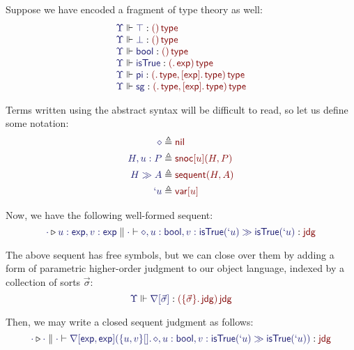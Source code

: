 \documentclass[11pt]{article}
\theoremstyle{definition}
\theoremstyle{remark}
\numberwithin{equation}{section}
\def\IModeColorName{MidnightBlue}
\def\OModeColorName{Maroon}
\newcommand\IMode[1]{{\color{\IModeColorName}{#1}}}
\newcommand\OMode[1]{{\color{\OModeColorName}{#1}}}
\newcommand\MkValence[3]{%
  \ifthenelse{\equal{#1}{}}{}{%
    \{#1\}%
  }%
  \ifthenelse{\equal{#2}{}}{}{%
    [#2]%
  }.\, #3%
}
\newcommand\MkBTm[3]{\{#1\}[#2].\, #3}
\newcommand\MkArity[2]{(#1)\, #2}
\newcommand\IsOperator[3]{\IMode{#1}\Vdash\IMode{#2}: \OMode{#3}}
\newcommand\IsAbt[5]{%
  \IMode{#1}\triangleright%
  \IMode{#2}\parallel%
  \IMode{#3}\vdash%
  \IMode{#4}:\OMode{#5}%
}
\newcommand\App[2]{#1(#2)}
\newcommand\SortExp{\mathsf{exp}}
\begin{document}
\newcommand\OpPi{\mathsf{pi}}
\newcommand\OpSg{\mathsf{sg}}
\newcommand\OpBool{\mathsf{bool}}
\newcommand\OpSo{\mathsf{isTrue}}

Suppose we have encoded a fragment of type theory as well:
\[
  \begin{array}{l}
    \IsOperator{\Upsilon}{\top}{
      \MkArity{}{\SortType}
    }\\
    \IsOperator{\Upsilon}{\bot}{
      \MkArity{}{\SortType}
    }\\
    \IsOperator{\Upsilon}{\OpBool}{
      \MkArity{}{\SortType}
    }\\
    \IsOperator{\Upsilon}{\OpSo}{
      \MkArity{
        \MkValence{}{}{\SortExp}
      }{\SortType}
    }\\
    \IsOperator{\Upsilon}{\OpPi}{
      \MkArity{
        \MkValence{}{}{\SortType},
        \MkValence{}{\SortExp}{\SortType}
      }{\SortType}
    }\\
    \IsOperator{\Upsilon}{\OpSg}{
      \MkArity{
        \MkValence{}{}{\SortType},
        \MkValence{}{\SortExp}{\SortType}
      }{\SortType}
    }\\
  \end{array}
\]

Terms written using the abstract syntax will be difficult to read, so let us
define some notation:
\begin{align*}
  \IMode{\diamond} &\triangleq \OMode{\OpNil}\\
  \IMode{H, u:P} &\triangleq \OMode{
    \App{\OpSnoc{u}}{H, P}
  }\\
  \IMode{H\gg A} &\triangleq \OMode{
    \App{\OpSequent}{
      H, A
    }
  }\\
  \IMode{`u} &\triangleq \OMode{\OpVar{u}}
\end{align*}

Now, we have the following well-formed sequent:
\[
  \IsAbt{\cdot}{
    u:\SortExp,
    v:\SortExp
  }{\cdot}{
    \diamond,u:\OpBool,v:\App{\OpSo}{`u}%
    \gg%
    \App{\OpSo}{`u}
  }{\SortJdg}
\]

\newcommand\OpNabla[1]{\nabla[#1]}

The above sequent has free symbols, but we can close over them by adding a form
of parametric higher-order judgment to our object language, indexed by a
collection of sorts $\vec{\sigma}$:
\[
  \IsOperator{\Upsilon}{\OpNabla{\vec{\sigma}}}{
    \MkArity{
      \MkValence{\vec{\sigma}}{}{\SortJdg}
    }{\SortJdg}
  }
\]

Then, we may write a closed sequent judgment as follows:
\[
  \IsAbt{\cdot}{\cdot}{\cdot}{
    \App{\OpNabla{\SortExp,\SortExp}}{
      \MkBTm{u,v}{}{
        \diamond,u:\OpBool,v:\App{\OpSo}{`u}%
        \gg%
        \App{\OpSo}{`u}
      }
    }
  }{\SortJdg}
\]
\end{document}
